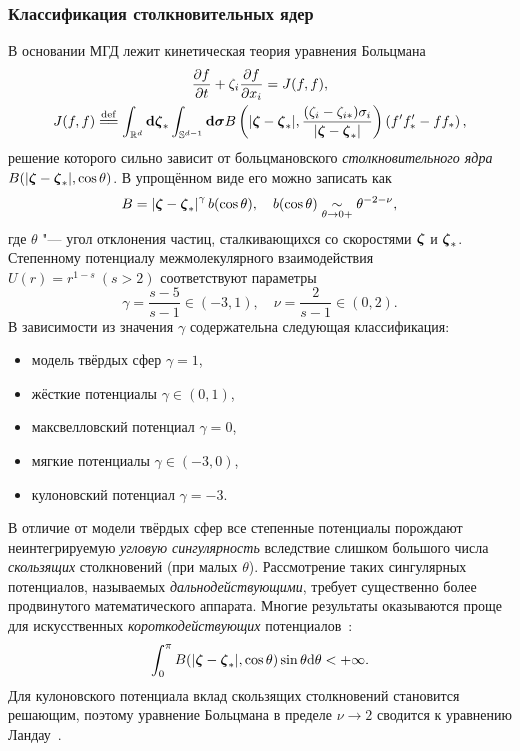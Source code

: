\subsubsection{Классификация столкновительных ядер}

В основании МГД лежит кинетическая теория уравнения Больцмана
\begin{gather*}
    \pder[f]{t} + \zeta_i\pder[f]{x_i} = J(f,f), \\
    J(f,f) \eqdef \int_{\mathbb{R}^d}\dzeta_*\int_{\mathbb{S}^{d-1}}\boldsymbol{\dd\sigma}
    B\left(|\bzeta - \bzeta_*|, \frac{(\zeta_i - \zeta_{i*})\sigma_i}{|\bzeta - \bzeta_*|}\right) \left(f'f'_* - ff_*\right),
\end{gather*}
решение которого сильно зависит от больцмановского \emph{столкновительного ядра} \(B(|{\boldsymbol{\zeta}} - {\boldsymbol{\zeta}}_*|, \cos\theta)\).
В упрощённом виде его можно записать как
\begin{equation*}
    B = \left|{\boldsymbol{\zeta}} - {\boldsymbol{\zeta}}_*\right|^\gamma b(\cos\theta), \quad b(\cos\theta) \underset{\theta\to0+}{\sim} \theta^{-2-\nu},
\end{equation*}
где \(\theta\) "--- угол отклонения частиц, сталкивающихся со скоростями \({\boldsymbol{\zeta}}\) и \({\boldsymbol{\zeta}}_*\).
Степенному потенциалу межмолекулярного взаимодействия \( U(r)=r^{1-s}\:(s>2) \) соответствуют параметры
\begin{equation*}
    \gamma = \frac{s-5}{s-1}\in(-3,1), \quad \nu = \frac{2}{s-1}\in(0,2).
\end{equation*}
В зависимости из значения \(\gamma\) содержательна следующая классификация:
\begin{itemize}\label{eq:power_classification}
    \item модель твёрдых сфер \(\gamma=1\),
    \item жёсткие потенциалы \(\gamma\in(0,1)\),
    \item максвелловский потенциал \(\gamma=0\),
    \item мягкие потенциалы \(\gamma\in(-3,0)\),
    \item кулоновский потенциал \(\gamma=-3\).
\end{itemize}
В отличие от модели твёрдых сфер все степенные потенциалы порождают неинтегрируемую \emph{угловую сингулярность}
вследствие слишком большого числа \emph{скользящих} столкновений (при малых \(\theta\)).
Рассмотрение таких сингулярных потенциалов, называемых \emph{дальнодействующими},
требует существенно более продвинутого математического аппарата.
Многие результаты оказываются проще для искусственных \emph{короткодействующих} потенциалов~\cite{Grad1970}:
\begin{equation*}\label{eq:angular_cutoff}
    \int_0^\pi B(|{\boldsymbol{\zeta}} - {\boldsymbol{\zeta}}_*|, \cos\theta)\sin\theta\mathrm{d}\theta < +\infty.
\end{equation*}
Для кулоновского потенциала вклад скользящих столкновений становится решающим,
поэтому уравнение Больцмана в пределе \(\nu\to2\) сводится к уравнению Ландау~\cite{Arseniev1990}.

